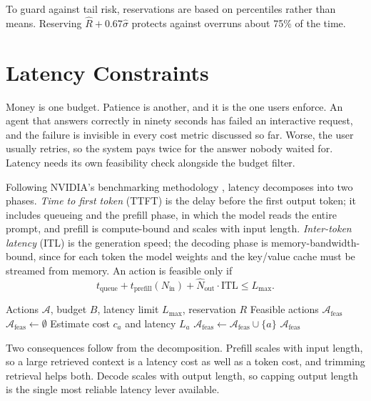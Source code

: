 \documentclass[11pt]{book}
\begin{document}
To guard against tail risk, reservations are based on percentiles rather than means. Reserving $\hat{R} + 0.67\hat{\sigma}$ protects against overruns about 75\% of the time.

\section{Latency Constraints}

Money is one budget. Patience is another, and it is the one users enforce. An agent that answers correctly in ninety seconds has failed an interactive request, and the failure is invisible in every cost metric discussed so far. Worse, the user usually retries, so the system pays twice for the answer nobody waited for. Latency needs its own feasibility check alongside the budget filter.

Following NVIDIA's benchmarking methodology \cite{nvidia2024benchmarking}, latency decomposes into two phases. \emph{Time to first token} (TTFT) is the delay before the first output token; it includes queueing and the prefill phase, in which the model reads the entire prompt, and prefill is compute-bound and scales with input length. \emph{Inter-token latency} (ITL) is the generation speed; the decoding phase is memory-bandwidth-bound, since for each token the model weights and the key/value cache must be streamed from memory. An action is feasible only if
\[
t_{\text{queue}} + t_{\text{prefill}}(N_{\text{in}}) + \hat{N}_{\text{out}} \cdot \text{ITL} \leq L_{\max}.
\]

\begin{algorithm}
\caption{Joint Cost--Latency Filtering}
\begin{algorithmic}[1]
\Require Actions $\mathcal{A}$, budget $B$, latency limit $L_{\max}$, reservation $R$
\Ensure Feasible actions $\mathcal{A}_{\text{feas}}$
\State $\mathcal{A}_{\text{feas}} \gets \emptyset$
    \State Estimate cost $c_a$ and latency $L_a$
        \State $\mathcal{A}_{\text{feas}} \gets \mathcal{A}_{\text{feas}} \cup \{a\}$
    \EndIf
\EndFor
\State \Return $\mathcal{A}_{\text{feas}}$
\end{algorithmic}
\end{algorithm}

Two consequences follow from the decomposition. Prefill scales with input length, so a large retrieved context is a latency cost as well as a token cost, and trimming retrieval helps both. Decode scales with output length, so capping output length is the single most reliable latency lever available.
\end{document}
